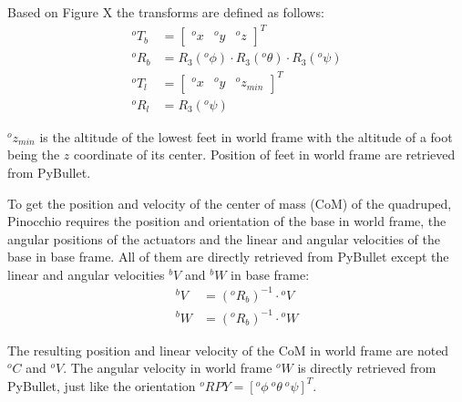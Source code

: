 \documentclass[a4paper,11pt]{article}
\begin{document}
Based on Figure X the transforms are defined as follows: 
\begin{align}
{}^o\!T_b &= \begin{bmatrix} {}^o\!x & {}^o\!y & {}^o\!z \end{bmatrix}^T \\
{}^o\!R_b &= R_3({}^o\phi) \cdot R_3({}^o\theta) \cdot R_3({}^o\psi) \\
{}^o\!T_l &= \begin{bmatrix} {}^o\!x & {}^o\!y & {}^o\!z_{min} \end{bmatrix}^T \\
{}^o\!R_l &= R_3({}^o\psi)
\end{align}


${}^o\!z_{min}$ is the altitude of the lowest feet in world frame with the altitude of a foot being the $z$ coordinate of its center. Position of feet in world frame are retrieved from PyBullet.

 
To get the position and velocity of the center of mass (CoM) of the quadruped, Pinocchio requires the position and orientation of the base in world frame, the angular positions of the actuators and the linear and angular velocities of the base in base frame. All of them are directly retrieved from PyBullet except the linear and angular velocities ${}^b\!V$ and ${}^b\!W$ in base frame: %
\begin{align}
{}^bV &= ({}^o\!R_b)^{-1} \cdot {}^oV \\
{}^bW &= ({}^o\!R_b)^{-1} \cdot {}^oW
\end{align}  

The resulting position and linear velocity of the CoM in world frame are noted ${}^o\!C$ and ${}^o\!V$. The angular velocity in world frame ${}^oW$ is directly retrieved from PyBullet, just like the orientation ${}^o\!RPY = [{}^o\!\phi ~ {}^o\!\theta ~ {}^o\!\psi]^T$.
\end{document}
